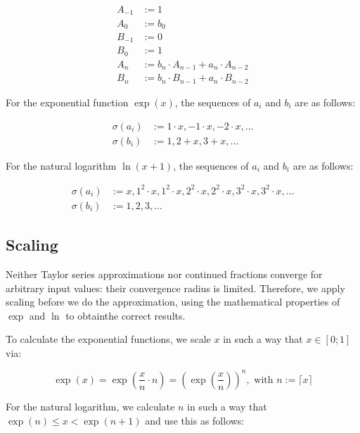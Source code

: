 \documentclass[11pt,a4paper,dvipsnames,twosided]{article}
\theoremstyle{definition}
\theoremstyle{definition}
\begin{document}
\begin{align*}
  A_{-1} & :=  1 \\
  A_{0} & :=  b_{0} \\
  B_{-1} & :=  0 \\
  B_{0} & := 1 \\
  A_{n} & :=  b_{n}\cdot A_{n-1} + a_{n}\cdot A_{n-2} \\
  B_{n} & :=  b_{n}\cdot B_{n-1} + a_{n}\cdot B_{n-2}
\end{align*}

For the exponential function $\exp(x)$, the sequences of $a_{i}$ and $b_{i}$ are
as follows:

\begin{align*}
  \sigma(a_{i}) & := 1 \cdot x, -1 \cdot x, -2 \cdot x, \ldots \\
  \sigma(b_{i}) & := 1, 2 + x, 3 + x, \ldots
\end{align*}

For the natural logarithm $\ln(x+1)$, the sequences of $a_{i}$ and $b_{i}$ are
as follows:

\begin{align*}
  \sigma(a_{i}) & := x, 1^{2}\cdot x, 1^{2}\cdot x, 2^{2}\cdot x, 2^{2}\cdot x, 3^{2}\cdot
          x, 3^{2}\cdot x, \ldots\\
  \sigma(b_{i}) & := 1, 2, 3, \ldots
\end{align*}

\subsection{Scaling}
\label{sec:scaling}

Neither Taylor series approximations nor continued fractions converge for arbitrary input
values: their convergence radius is limited. Therefore, we apply scaling before
we do the approximation, using the mathematical properties of $\exp$ and $\ln$
to obtainthe correct results.

To calculate the exponential functions, we scale $x$ in such a way that
$x \in [0; 1]$ via:

\begin{equation*}
  \exp(x) = \exp
  \left(
    \frac{x}{n}\cdot n
  \right) =
  {\left(
      \exp{
        \left(
          \frac{x}{n}
        \right)}
    \right)}^{n}, \text{ with } n := \lceil x \rceil
\end{equation*}

For the natural logarithm, we calculate $n$ in such a way that
$\exp(n) \leq x < \exp(n+1)$ and use this as follows:
\end{document}
